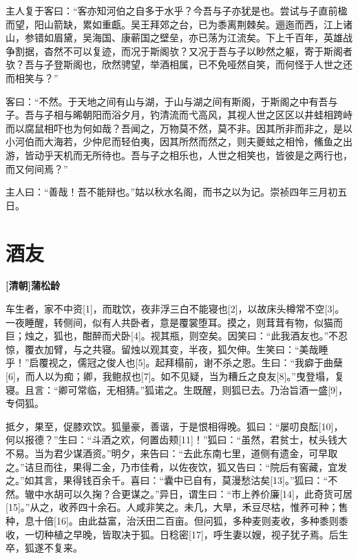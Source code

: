 \documentclass[UTF8,titlepage,oneside]{ctexbook}
\begin{document}
主人复于客曰：“客亦知河伯之自多于水乎？今吾与子亦犹是也。尝试与子直前楹而望，阳山箭缺，累如重甗。吴王拜郊之台，已为黍离荆棘矣。逦迤而西，江上诸山，参错如眉黛，吴海国、康蕲国之壁垒，亦已荡为江流矣。下上千百年，英雄战争割据，杳然不可以复迹，而况于斯阁欤？又况于吾与子以眇然之躯，寄于斯阁者欤？吾与子登斯阁也，欣然骋望，举酒相属，已不免哑然自笑，而何怪于人世之还而相笑与？”


客曰：“不然。于天地之间有山与湖，于山与湖之间有斯阁，于斯阁之中有吾与子。吾与子相与晞朝阳而浴夕月，钓清流而弋高风，其视人世之区区以井蛙相跨峙而以腐鼠相吓也为何如哉？吾闻之，万物莫不然，莫不非。因其所非而非之，是以小河伯而大海若，少仲尼而轻伯夷，因其所然而然之，则夫夔蚿之相怜，鯈鱼之出游，皆动乎天机而无所待也。吾与子之相乐也，人世之相笑也，皆彼是之两行也，而又何间焉？”


主人曰：“善哉！吾不能辩也。”姑以秋水名阁，而书之以为记。崇祯四年三月初五日。



\chapter*{酒友}
\begin{center}
	\textbf{[清朝]蒲松龄}
\end{center}

车生者，家不中资[1]，而耽饮，夜非浮三白不能寝也[2]，以故床头樽常不空[3]。一夜睡醒，转侧间，似有人共卧者，意是覆裳堕耳。摸之，则茸茸有物，似猫而巨；烛之，狐也，酣醉而犬卧[4]。视其瓶，则空矣。因笑曰：“此我酒友也。”不忍惊，覆衣加臂，与之共寝。留烛以观其变，半夜，狐欠伸。生笑曰：“美哉睡乎！”启覆视之，儒冠之俊人也[5]。起拜榻前，谢不杀之恩。生曰：“我癖于曲蘖[6]，而人以为痴；卿，我鲍叔也[7]。如不见疑，当为糟丘之良友[8]。”曳登塌，复寝。且言：“卿可常临，无相猜。”狐诺之。生既醒，则狐已去。乃治旨酒一盛[9]，专伺狐。

抵夕，果至，促膝欢饮。狐量豪，善谐，于是恨相得晚。狐曰：“屡叨良酝[10]，何以报德？”生曰：“斗酒之欢，何置齿颊[11]！”狐曰：“虽然，君贫士，杖头钱大不易。当为君少谋酒资。”明夕，来告曰：“去此东南七里，道侧有遗金，可早取之。”诘旦而往，果得二金，乃市佳肴，以佐夜饮，狐又告曰：“院后有窖藏，宜发之。”如其言，果得钱百余千。喜曰：“囊中已自有，莫漫愁沽矣[13]。”狐曰：“不然。辙中水胡可以久掬？合更谋之。”异日，谓生曰：“市上养价廉[14]，此奇货可居[15]。”从之，收荞四十余石。人咸非笑之。未几，大旱，禾豆尽枯，惟荞可种；售种，息十倍[16]。由此益富，治沃田二百亩。但问狐，多种麦则麦收，多种黍则黍收，一切种植之早晚，皆取决于狐。日稔密[17]，呼生妻以嫂，视子犹子焉。后生卒，狐遂不复来。 
\end{document}
